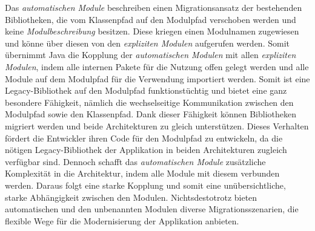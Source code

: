     Das \textit{automatischen Module} beschreiben einen Migrationsansatz der bestehenden Bibliotheken, die vom Klassenpfad auf den Modulpfad verschoben werden und keine \textit{Modulbeschreibung} besitzen. 
    Diese kriegen einen Modulnamen zugewiesen und könne über diesen von den \textit{expliziten Modulen} aufgerufen werden. 
    Somit übernimmt Java die Kopplung der \textit{automatischen Modulen} mit allen \textit{expliziten Modulen}, indem alle internen Pakete für die Nutzung offen gelegt werden und alle Module auf dem Modulpfad für die Verwendung importiert werden.
    Somit ist eine Legacy-Bibliothek auf den Modulpfad funktionstüchtig und bietet eine ganz besondere Fähigkeit, nämlich die wechselseitige Kommunikation zwischen den Modulpfad sowie den Klassenpfad. 
    Dank dieser Fähigkeit können Bibliotheken migriert werden und beide Architekturen zu gleich unterstützen. 
    Dieses Verhalten fördert die Entwickler ihren Code für den Modulpfad zu entwickeln, da die nötigen Legacy-Bibliothek der Applikation in beiden Architekturen zugleich verfügbar sind. 
    Dennoch schafft das \textit{automatischen Module} zusätzliche Komplexität in die Architektur, indem 
    alle Module mit diesem verbunden werden. Daraus folgt eine starke Kopplung und somit eine unübersichtliche, starke Abhängigkeit zwischen den Modulen.
    \newline Nichtsdestotrotz bieten automatischen und den unbenannten Modulen diverse Migrationsszenarien, die flexible Wege für die Modernisierung der Applikation anbieten. 

